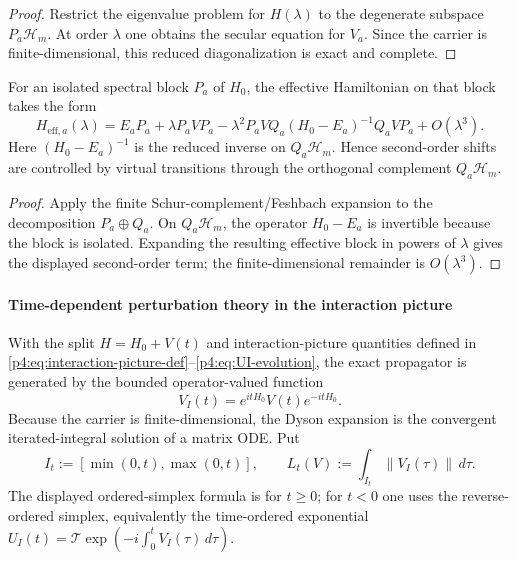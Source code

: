 \documentclass[12pt,a4paper]{article}
\begin{document}
\begin{proof}
Restrict the eigenvalue problem for $H(\lambda)$ to the degenerate subspace $P_a\mathcal H_m$.
At order $\lambda$ one obtains the secular equation for $V_a$.
Since the carrier is finite-dimensional, this reduced diagonalization is exact and complete.
\end{proof}

\begin{corollary}
\label{p4:cor:second-order-effective}
For an isolated spectral block $P_a$ of $H_0$, the effective Hamiltonian on that block takes the form
\begin{equation}
\label{p4:eq:heff-second-order}
H_{\mathrm{eff},a}(\lambda)
=
E_a P_a
+\lambda P_aVP_a
-\lambda^2 P_aVQ_a(H_0-E_a)^{-1}Q_aVP_a
+O(\lambda^3).
\end{equation}
Here \((H_0-E_a)^{-1}\) is the reduced inverse on \(Q_a\mathcal H_m\).  Hence second-order shifts are controlled by virtual transitions through the orthogonal complement $Q_a\mathcal H_m$.
\end{corollary}

\begin{proof}
Apply the finite Schur-complement/Feshbach expansion to the decomposition \(P_a\oplus Q_a\).  On \(Q_a\mathcal H_m\), the operator \(H_0-E_a\) is invertible because the block is isolated.  Expanding the resulting effective block in powers of \(\lambda\) gives the displayed second-order term; the finite-dimensional remainder is \(O(\lambda^3)\).
\end{proof}




\paragraph{Time-dependent perturbation theory in the interaction picture}
\label{p4:sec:part2-timedep-perturbation}

With the split $H=H_0+V(t)$ and interaction-picture quantities defined in \eqref{p4:eq:interaction-picture-def}--\eqref{p4:eq:UI-evolution}, the exact propagator is generated by the bounded operator-valued function
\begin{equation}
\label{p4:eq:VIt-reminder}
V_I(t)=e^{itH_0}V(t)e^{-itH_0}.
\end{equation}
Because the carrier is finite-dimensional, the Dyson expansion is the
convergent iterated-integral solution of a matrix ODE.  Put
\[
I_t:=[\min(0,t),\max(0,t)],
\qquad
L_t(V):=\int_{I_t}\|V_I(\tau)\|\,d\tau .
\]
The displayed ordered-simplex formula is for \(t\ge0\); for \(t<0\) one
uses the reverse-ordered simplex, equivalently the time-ordered exponential
\(U_I(t)=\mathcal T\exp(-i\int_0^tV_I(\tau)\,d\tau)\).
\end{document}
